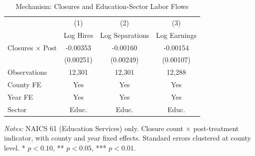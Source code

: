 \begin{table}[htbp]
\centering
\caption{Mechanism: Closures and Education-Sector Labor Flows}
\label{tab:mechanism}
\begin{tabular}{lccc}
\hline\hline
 & (1) & (2) & (3) \\
 & Log Hires & Log Separations & Log Earnings \\
\hline
Closures $\times$ Post & -0.00353 & -0.00160 & -0.00154 \\
 & (0.00251) & (0.00249) & (0.00107) \\
\hline
Observations & 12,301 & 12,301 & 12,288 \\
County FE & Yes & Yes & Yes \\
Year FE & Yes & Yes & Yes \\
Sector & Educ. & Educ. & Educ. \\
\hline\hline
\end{tabular}
\begin{tablenotes}[flushleft]\small
\item \textit{Notes:} NAICS 61 (Education Services) only. Closure count $\times$ post-treatment
indicator, with county and year fixed effects. Standard errors clustered at county level.
* $p<0.10$, ** $p<0.05$, *** $p<0.01$.
\end{tablenotes}
\end{table}
